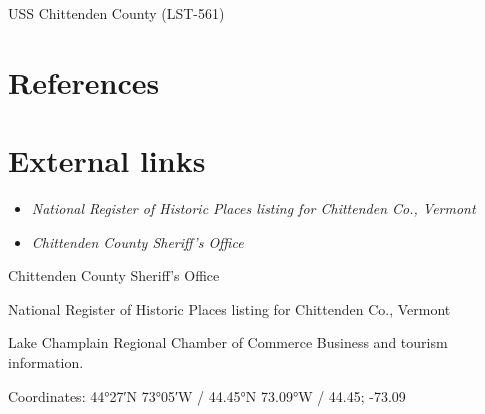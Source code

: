 USS Chittenden County (LST-561)

\section{References}\label{references}

\section{External links}\label{external-links}

\begin{itemize}
\item
  \emph{National Register of Historic Places listing for Chittenden Co.,
  Vermont}
\item
  \emph{Chittenden County Sheriff's Office}
\end{itemize}

Chittenden County Sheriff's Office

National Register of Historic Places listing for Chittenden Co., Vermont

Lake Champlain Regional Chamber of Commerce Business and tourism
information.

Coordinates: 44°27′N 73°05′W﻿ / ﻿44.45°N 73.09°W﻿ / 44.45; -73.09
